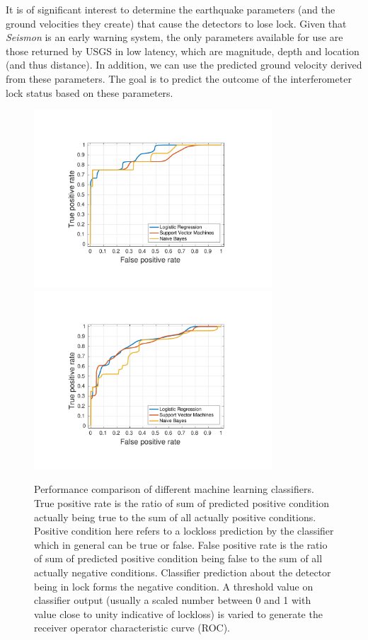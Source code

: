 \documentclass[twocolumn, prl, superscriptaddress]{revtex4}
\begin{document}
It is of significant interest to determine the earthquake parameters (and the ground velocities they create) that cause the detectors to lose lock.
Given that \emph{Seismon} is an early warning system, the only parameters available for use are those returned by USGS in low latency, which are magnitude, depth and location (and thus distance). 
In addition, we can use the predicted ground velocity derived from these parameters.
The goal is to predict the outcome of the interferometer lock status based on these parameters.

\begin{figure}[t]
\hspace*{-0.5cm}
 \includegraphics[width=3.5in, trim = 2.5cm 1.5cm 2.5cm 1.5cm, clip=true]{lho_lockloss_ROC.pdf}
  \includegraphics[width=3.5in, trim = 2.5cm 1.5cm 2.5cm 1.5cm, clip=true]{llo_lockloss_ROC.pdf}
 \caption{Performance comparison of different machine learning classifiers. True positive rate is the ratio of sum of predicted positive condition actually being true to the sum of all actually positive conditions. Positive condition here refers to a lockloss prediction by the classifier which in general can be true or false. False positive rate is the ratio of sum of predicted positive condition being false to the sum of all actually negative conditions. Classifier prediction about the detector being in lock forms the negative condition. A threshold value on classifier output (usually a scaled number between 0 and 1 with value close to unity indicative of lockloss) is varied to generate the receiver operator characteristic curve (ROC).
 }
 \label{fig:MLA_comparison}
\end{figure}
\end{document}
